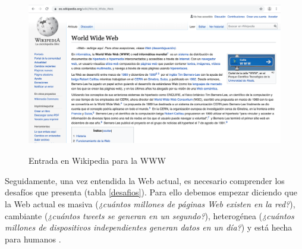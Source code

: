 \begin{figure}[H]
	\centering
	\includegraphics[height=6.95cm]{imagenes/capitulo3/wikipedia}
	\caption{Entrada en Wikipedia para la WWW}
	\label{fig:wikipedia}
\end{figure}










Seguidamente, una vez entendida la Web actual, es necesario comprender los desafíos que presenta (tabla \ref{desafios}). Para ello debemos empezar diciendo que la Web actual es masiva (\textit{¿cuántos millones de páginas Web existen en la red?}), cambiante (\textit{¿cuántos tweets se generan en un segundo?}), heterogénea (\textit{¿cuántos millones de dispositivos independientes generan datos en un día?}) y está hecha para humanos \cite{coursera}.

